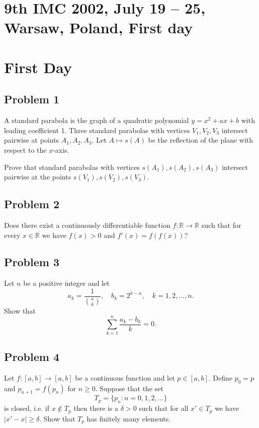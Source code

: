\documentclass{article}
\begin{document}
\pagestyle{plain}

\section*{9th IMC 2002, July 19 -- 25, Warsaw, Poland, First day}

\section*{First Day}

\subsection*{Problem 1}
A standard parabola is the graph of a quadratic polynomial $y = x^2 + ax + b$ with leading coefficient 1.
Three standard parabolas with vertices $V_1, V_2, V_3$ intersect pairwise at points $A_1, A_2, A_3$.
Let $A \mapsto s(A)$ be the reflection of the plane with respect to the $x$-axis.

Prove that standard parabolas with vertices $s(A_1), s(A_2), s(A_3)$ intersect pairwise at the points
$s(V_1), s(V_2), s(V_3)$.

\subsection*{Problem 2}
Does there exist a continuously differentiable function
$f : \mathbb{R} \to \mathbb{R}$ such that for every $x \in \mathbb{R}$
we have $f(x) > 0$ and $f'(x) = f(f(x))$?

\subsection*{Problem 3}
Let $n$ be a positive integer and let
\[
a_k = \frac{1}{\binom{n}{k}}, \quad b_k = 2^{k-n}, \quad k = 1, 2, \ldots, n.
\]
Show that
\[
\sum_{k=1}^{n} \frac{a_k - b_k}{k} = 0.
\]

\subsection*{Problem 4}
Let $f: [a, b] \to [a, b]$ be a continuous function and let $p \in [a, b]$.
Define $p_0 = p$ and $p_{n+1} = f(p_n)$ for $n \geq 0$. Suppose that the set
\[
T_p = \{p_n : n = 0, 1, 2, \ldots\}
\]
is closed, i.e. if $x \notin T_p$ then there is a $\delta > 0$ such
that for all $ x' \in T_p $ we have $|x'-x| \geq \delta $.
Show that $T_p$ has finitely many elements.
\end{document}
